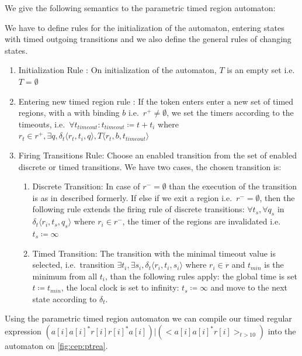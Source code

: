 			We give the following semantics to the parametric timed region automaton:
			
			We have to define rules for the initialization of the automaton,
			entering states with timed outgoing transitions 
			and we also define the general rules of changing states. 
			
			\begin{enumerate}
				\item Initialization Rule : On initialization of the automaton, $T$ is an empty set
				i.e.~$T = \emptyset$
			
				\item Entering new timed region rule :
				If the token enters enter a new set of timed regions, with a with binding $b$ 
				i.e.~$r^+ \neq \emptyset$, 
				we set the timers according to the timeouts, 
				i.e.~$\forall t_{timeout} : t_{timeout} \coloneqq t + t_i $ where $ r_t \in r^+, \exists q ,\delta_t\langle  r_t,t_i,q \rangle, T \langle r_t,b, t_{timeout} \rangle$
				
				\item Firing Transitions Rule: Choose an enabled transition from the set of enabled discrete or timed transitions. 
				We have two cases, the chosen transition is:
					\begin{enumerate}
						\item Discrete Transition: In case of $r^- = \emptyset$ than the execution of the transition is as in described formerly. 
							If else if we exit a region i.e.~$r^- = \emptyset$, 
							then the following rule extends the firing rule of discrete transitions:
							$\forall t_s, \forall q_s$ in $ \delta_t \langle r_i, t_s, q_s \rangle$ where $r_i \in r^-$, the timer of the regions are invalidated i.e.~
							$t_s \coloneqq \infty$
						\item Timed Transition: The transition with the minimal timeout value is selected, 
							 i.e.~transition $\exists t_i, \exists s_i, \delta_t \langle r_i, t_i, s_i \rangle$ where $ r_i \in r$ and $t_{min}$ is the minimum from all $t_i$,
							 than the following rules apply:
							 the global time is set $t \coloneqq t_{min}$, 
							 the local clock is set to infinity: $t_s \coloneqq \infty$ 
							 and move to the next state according to $\delta_t$.
					\end{enumerate}			
			\end{enumerate}

			Using the parametric timed region automaton we can compile our timed regular expression 
			$(a[i] a[i]^\ast  r[i] r[i]^\ast a[i]) | (<a[i] a[i]^\ast r[i]>_{t > 10} )$ into the automaton on \cref{fig:cep:ptrea}.


